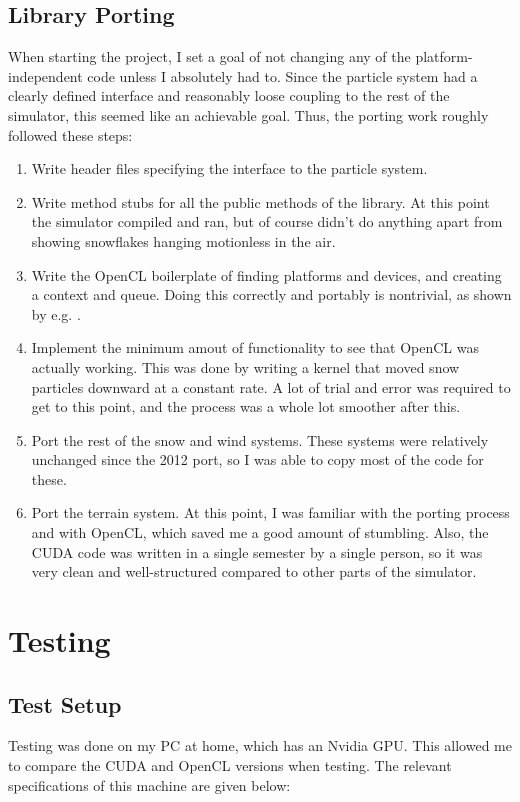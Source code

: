 \subsection{Library Porting}
When starting the project, I set a goal of not changing any of the platform-independent code unless I absolutely had to. Since the particle system had a clearly defined interface and reasonably loose coupling to the rest of the simulator, this seemed like an achievable goal. Thus, the porting work roughly followed these steps:
\begin{enumerate}
\item Write header files specifying the interface to the particle system.
\item Write method stubs for all the public methods of the library. At this point the simulator compiled and ran, but of course didn’t do anything apart from showing snowflakes hanging motionless in the air.
\item Write the OpenCL boilerplate of finding platforms and devices, and creating a context and queue. Doing this correctly and portably is nontrivial, as shown by e.g. \citet{fastkor2012boilerplate}.
\item Implement the minimum amout of functionality to see that OpenCL was actually working. This was done by writing a kernel that moved snow particles downward at a constant rate. A lot of trial and error was required to get to this point, and the process was a whole lot smoother after this. 
\item Port the rest of the snow and wind systems. These systems were relatively unchanged since the 2012 port, so I was able to copy most of the code for these.
\item Port the terrain system. At this point, I was familiar with the porting process and with OpenCL, which saved me a good amount of stumbling. Also, the CUDA code was written in a single semester by a single person, so it was very clean and well-structured compared to other parts of the simulator.
\end{enumerate}

\section{Testing}
\subsection{Test Setup}
Testing was done on my PC at home, which has an Nvidia GPU. This allowed me to compare the CUDA and OpenCL versions when testing. The relevant specifications of this machine are given below:

